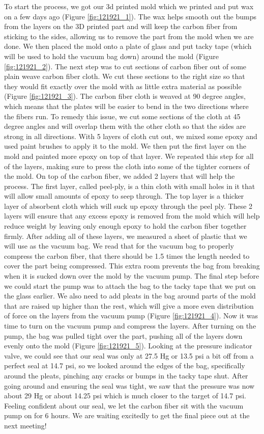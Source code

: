 To start the process, we got our 3d printed mold which we printed and put wax on a few days ago (Figure \ref{fig:121921_1}). The wax helps smooth out the bumps from the layers on the 3D printed part and will keep the carbon fiber from sticking to the sides, allowing us to remove the part from the mold when we are done. We then placed the mold onto a plate of glass and put tacky tape (which will be used to hold the vacuum bag down) around the mold (Figure \ref{fig:121921_2}). The next step was to cut sections of carbon fiber out of some plain weave carbon fiber cloth. We cut these sections to the right size so that they would fit exactly over the mold with as little extra material as possible (Figure \ref{fig:121921_3}). The carbon fiber cloth is weaved at 90 degree angles, which means that the plates will be easier to bend in the two directions where the fibers run. To remedy this issue, we cut some sections of the cloth at 45 degree angles and will overlap them with the other cloth so that the sides are strong in all directions. With 5 layers of cloth cut out, we mixed some epoxy and used paint brushes to apply it to the mold. We then put the first layer on the mold and painted more epoxy on top of that layer. We repeated this step for all of the layers, making sure to press the cloth into some of the tighter corners of the mold. On top of the carbon fiber, we added 2 layers that will help the process. The first layer, called peel-ply, is a thin cloth with small holes in it that will allow small amounts of epoxy to seep through. The top layer is a thicker layer of absorbent cloth which will suck up epoxy through the peel ply. These 2 layers will ensure that any excess epoxy is removed from the mold which will help reduce weight by leaving only enough epoxy to hold the carbon fiber together firmly. After adding all of these layers, we measured a sheet of plastic that we will use as the vacuum bag. We read that for the vacuum bag to properly compress the carbon fiber, that there should be 1.5 times the length needed to cover the part being compressed. This extra room prevents the bag from breaking when it is sucked down over the mold by the vacuum pump. The final step before we could start the pump was to attach the bag to the tacky tape that we put on the glass earlier. We also need to add pleats in the bag around parts of the mold that are raised up higher than the rest, which will give a more even distribution of force on the layers from the vacuum pump (Figure \ref{fig:121921_4}). 
Now it was time to turn on the vacuum pump and compress the layers. After turning on the pump, the bag was pulled tight over the part, pushing all of the layers down evenly onto the mold (Figure \ref{fig:121921_5}). Looking at the pressure indicator valve, we could see that our seal was only at 27.5 Hg or 13.5 psi a bit off from a perfect seal at 14.7 psi, so we looked around the edges of the bag, specifically around the pleats, pinching any cracks or bumps in the tacky tape shut. After going around and ensuring the seal was tight, we saw that the pressure was now about 29 Hg or about 14.25 psi which is much closer to the target of 14.7 psi. Feeling confident about our seal, we let the carbon fiber sit with the vacuum pump on for 6 hours. We are waiting excitedly to get the final piece out at the next meeting!


